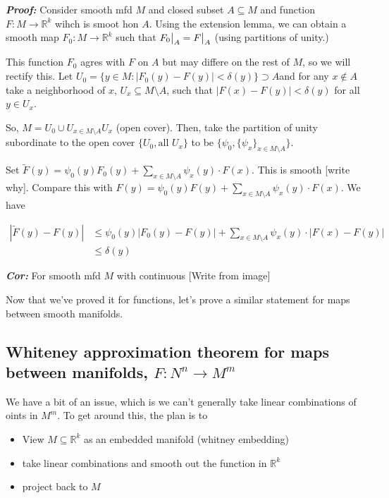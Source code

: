 \documentclass{article}
\newcommand{\R}{\mathbb{R}}
\newcommand{\restr}[2]{{%
  \left.\kern-\nulldelimiterspace %
  #1 %
  \vphantom{\big|} %
  \right|_{#2} %
  }}
\begin{document}
\textbf{\emph{Proof:}} Consider smooth mfd $M$ and closed subset $A \subseteq M$ and function $F: M \rightarrow \R^k$ wihch is smoot hon $A$. Using the extension lemma, we can obtain a smooth map $F_0 : M \rightarrow \R^k$ such that $\restr{F_0}{A} = \restr{F}{A}$ (using partitions of unity.)

\vskip 0.25cm
This function $F_0$ agres with $F$ on $A$ but may differe on the rest of $M$, so we will rectify this. Let $U_0= \{ y \in M : \left| F_0(y) - F(y) \right| < \delta(y) \} \supset A$and for any $x \not\in A$ take a neighborhood of $x$, $U_x \subseteq M \setminus A$, such that $\left| F(x) - F(y) \right| < \delta(y)$ for all $y \in U_x$.

\vskip 0.25cm
So, $M = U_0 \cup U_{x \in M \setminus A} U_x$ (open cover). Then, take the partition of unity subordinate to the open cover $\{U_0, \text{all }U_x\}$ to be $\{\psi_0, \{\psi_x\}_{x \in M \setminus A}\}$.

Set $\tilde{F}(y) = \psi_0(y)F_0(y) + \sum_{x \in M \setminus A} \psi_x(y) \cdot F(x) $. This is smooth [write why]. Compare this with $F(y) = \psi_0(y)F(y) + \sum_{x \in M \setminus A} \psi_x(y) \cdot F(x)$. We have 

\vskip 0.25cm
\begin{align*}
  |\tilde{F}(y) - F(y) | &\leq \psi_0(y)|F_0(y)- F(y) | + \sum_{x \in M \setminus A} \psi_x(y) \cdot |F(x)-F(y)| \\
  &\leq \delta(y)
\end{align*}

\vskip 0.5cm
\begin{dottedbox}
  \emph{\textbf{Cor:}} For smooth mfd $M$ with continuous [Write from image]
\end{dottedbox}

\vskip 0.25cm
Now that we've proved it for functions, let's prove a similar statement for maps between smooth manifolds.

\vskip 1cm
\subsection{Whiteney approximation theorem for maps between manifolds, $F : N^n \rightarrow M^m$}

\vskip 0.25cm
We have a bit of an issue, which is we can't generally take linear combinations of oints in $M^m$. To get around this, the plan is to 
\begin{itemize}
  \item View $M \subseteq \R^k$ as an embedded manifold (whitney embedding)
  \item take linear combinations and smooth out the function in $\R^k$
  \item project back to $M$
\end{itemize}
\end{document}
